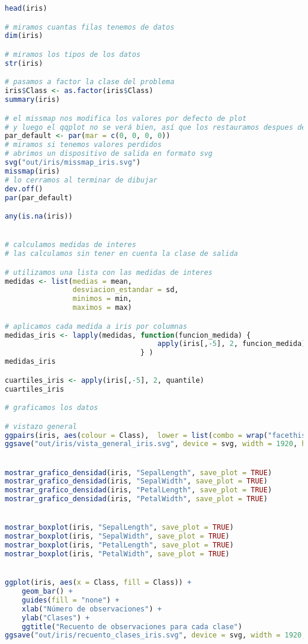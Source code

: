 \begin{lstlisting}[language=R]
head(iris)

# miramos cuantas filas tenemos de datos
dim(iris)

# miramos los tipos de los datos
str(iris)

# pasamos a factor la clase del problema
iris$Class <- as.factor(iris$Class)
summary(iris)

# el missmap nos modifica los valores por defecto de plot
# y luego el qqplot no se verá bien, así que los restauramos despues del missmap
par_default <- par(mar = c(0, 0, 0, 0))
# miramos si tenemos valores perdidos
# abrimos un dispositivo de salida en formato svg
svg("out/iris/missmap_iris.svg")
missmap(iris)
# lo cerramos al terminar de dibujar
dev.off()
par(par_default)

any(is.na(iris))


# calculamos medidas de interes
# las calculamos sin tener en cuenta la clase de salida

# utilizamos una lista con las medidas de interes
medidas <- list(medias = mean,
				desviacion_estandar = sd,
				minimos = min,
				maximos = max)

# aplicamos cada medida a iris por columnas
medidas_iris <- lapply(medidas, function(funcion_medida) {
									apply(iris[,-5], 2, funcion_medida)
								} )
medidas_iris

cuartiles_iris <- apply(iris[,-5], 2, quantile)
cuartiles_iris

# graficamos los datos

# vistazo general
ggpairs(iris, aes(colour = Class),  lower = list(combo = wrap("facethist", bins = 20))) + theme_minimal()
ggsave("out/iris/vista_general_iris.svg", device = svg, width = 1920, height = 1080, units = "px", dpi = 150)


mostrar_grafico_densidad(iris, "SepalLength", save_plot = TRUE)
mostrar_grafico_densidad(iris, "SepalWidth", save_plot = TRUE)
mostrar_grafico_densidad(iris, "PetalLength", save_plot = TRUE)
mostrar_grafico_densidad(iris, "PetalWidth", save_plot = TRUE)


mostrar_boxplot(iris, "SepalLength", save_plot = TRUE)
mostrar_boxplot(iris, "SepalWidth", save_plot = TRUE)
mostrar_boxplot(iris, "PetalLength", save_plot = TRUE)
mostrar_boxplot(iris, "PetalWidth", save_plot = TRUE)


ggplot(iris, aes(x = Class, fill = Class)) +
	geom_bar() +
	guides(fill = "none") +
	xlab("Número de observaciones") +
	ylab("Clases") +
	ggtitle("Recuento de observaciones para cada clase")
ggsave("out/iris/recuento_clases_iris.svg", device = svg, width = 1920, height = 1080, units = "px", dpi = 150)


\end{lstlisting}
